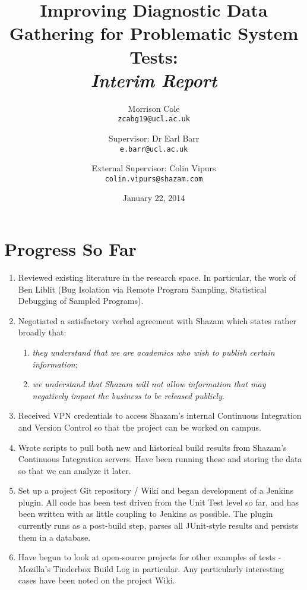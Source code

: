 
\setcounter{oldSectionCounter}{\value{section}}
\setcounter{oldPageCounter}{\value{page}}

\setcounter{section}{0}

\title{
	Improving Diagnostic Data Gathering for Problematic System Tests:\\
	\itshape{Interim Report}
}
\author{
	Morrison Cole\\
	\texttt{zcabg19@ucl.ac.uk}
	\and
	Supervisor: Dr Earl Barr\\
	\texttt{e.barr@ucl.ac.uk}
	\and
	External Supervisor: Colin Vipurs\\
	\texttt{colin.vipurs@shazam.com}
}
\date{January 22, 2014}

\maketitle

\section{Progress So Far}

\begin{enumerate}
	\item{
		Reviewed existing literature in the research space. In particular, the work of Ben Liblit (Bug Isolation via Remote Program Sampling, Statistical Debugging of Sampled Programs).
	}
	\item{
		Negotiated a satisfactory verbal agreement with Shazam which states rather broadly that:
		\begin{enumerate}
		\item{\itshape they understand that we are academics who wish to publish certain information};
		\item {\itshape we understand that Shazam will not allow information that may negatively impact the business to be released publicly}.
		\end{enumerate}
	}
	\item{
		Received VPN credentials to access Shazam's internal Continuous Integration and Version Control so that the project can be worked on campus.
	}
	\item{
		Wrote scripts to pull both new and historical build results from Shazam's Continuous Integration servers. Have been running these and storing the data so that we can analyze it later.
	}
	\item{
		Set up a project Git repository / Wiki and began development of a Jenkins plugin. All code has been test driven from the Unit Test level so far, and has been written with as little coupling to Jenkins as possible. The plugin currently runs as a post-build step, parses all JUnit-style results and persists them in a database.
	}
	\item{
		Have begun to look at open-source projects for other examples of \flaky{} tests - Mozilla's Tinderbox Build Log in particular. Any particularly interesting cases have been noted on the project Wiki.
	}
\end{enumerate}

